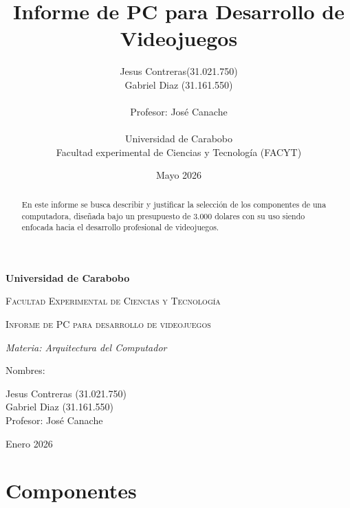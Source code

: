 \documentclass[]{article}
\title{Informe de PC para Desarrollo de Videojuegos}
\date{Mayo 2026}
\author{Jesus Contreras(31.021.750)\\Gabriel Diaz (31.161.550)\\\\Profesor: José Canache\\\\Universidad de Carabobo\\Facultad experimental de Ciencias y Tecnología (FACYT)}
\begin{document}
	\begin{titlepage}
		\centering
		{\bfseries\LARGE Universidad de Carabobo \par}
		\vspace{1cm}
		{\scshape\Large Facultad Experimental de Ciencias y Tecnología \par}
		\vspace{3cm}
		{\scshape\Huge Informe de PC para desarrollo de videojuegos\par}
		\vspace{3cm}
		{\itshape\Large Materia: Arquitectura del Computador \par}
		\vfill
		{\Large Nombres:  \par}
		{\Large Jesus Contreras (31.021.750)\\Gabriel Diaz (31.161.550)\\Profesor: José Canache \par}
		
		\vfill
		{\Large Enero 2026 \par}
	\end{titlepage}
	\begin{abstract}
		
	\noindent En este informe se busca describir y justificar la selección de los componentes de una computadora, diseñada bajo un presupuesto de 3.000 dolares con su uso siendo enfocada hacia el desarrollo profesional de videojuegos.
		
	\end{abstract}
	
	\section{Componentes}
\end{document}
